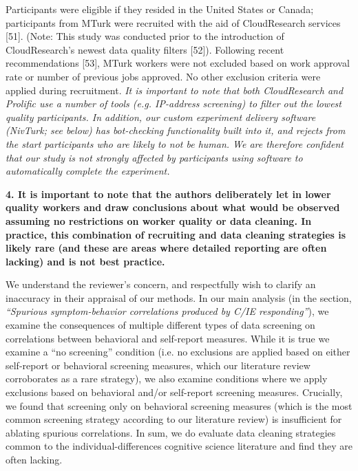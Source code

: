 \documentclass[a4paper,notitlepage,12pt]{article}
\begin{document}
\begin{displayquote}
Participants were eligible if they resided in the United States or Canada; participants from MTurk were recruited with the aid of CloudResearch services [51]. (Note: This study was conducted prior to the introduction of CloudResearch’s newest data quality filters [52]). Following recent recommendations [53], MTurk workers were not excluded based on work approval rate or number of previous jobs approved. No other exclusion criteria were applied during recruitment. \textit{It is important to note that both CloudResearch and Prolific use a number of tools (e.g. IP-address screening) to filter out the lowest quality participants. In addition, our custom experiment delivery software (NivTurk; see below) has bot-checking functionality built into it, and rejects from the start participants who are likely to not be human. We are therefore confident that our study is not strongly affected by participants using software to automatically complete the experiment.}
\end{displayquote}

\textbf{4. It is important to note that the authors deliberately let in lower quality workers and draw conclusions about what would be observed assuming no restrictions on worker quality or data cleaning. In practice, this combination of recruiting and data cleaning strategies is likely rare (and these are areas where detailed reporting are often lacking) and is not best practice.}

We understand the reviewer's concern, and respectfully wish to clarify an inaccuracy in their appraisal of our methods. In our main analysis (in the section, \textit{``Spurious symptom-behavior correlations produced by C/IE responding''}), we examine the consequences of multiple different types of data screening on correlations between behavioral and self-report measures. While it is true we examine a ``no screening'' condition (i.e. no exclusions are applied based on either self-report or behavioral screening measures, which our literature review corroborates as a rare strategy), we also examine conditions where we apply exclusions based on behavioral and/or self-report screening measures. Crucially, we found that screening only on behavioral screening measures (which is the most common screening strategy according to our literature review) is insufficient for ablating spurious correlations. In sum, we do evaluate data cleaning strategies common to the individual-differences cognitive science literature and find they are often lacking. 
\end{document}
